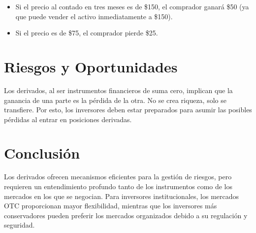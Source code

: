 \documentclass{article}
\begin{document}
\begin{itemize}
    \item Si el precio al contado en tres meses es de \$150, el comprador ganará \$50 (ya que puede vender el activo inmediatamente a \$150).
    \item Si el precio es de \$75, el comprador pierde \$25.
\end{itemize}

\section*{Riesgos y Oportunidades}

Los derivados, al ser instrumentos financieros de suma cero, implican que la ganancia de una parte es la pérdida de la otra. No se crea riqueza, solo se transfiere. Por esto, los inversores deben estar preparados para asumir las posibles pérdidas al entrar en posiciones derivadas.

\section*{Conclusión}

Los derivados ofrecen mecanismos eficientes para la gestión de riesgos, pero requieren un entendimiento profundo tanto de los instrumentos como de los mercados en los que se negocian. Para inversores institucionales, los mercados OTC proporcionan mayor flexibilidad, mientras que los inversores más conservadores pueden preferir los mercados organizados debido a su regulación y seguridad.
\end{document}
